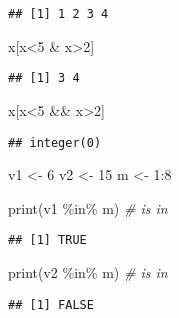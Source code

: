 \documentclass[
]{article}
\newenvironment{Shaded}{\begin{snugshade}}{\end{snugshade}}
\newcommand{\CommentTok}[1]{\textcolor[rgb]{0.56,0.35,0.01}{\textit{#1}}}
\newcommand{\DecValTok}[1]{\textcolor[rgb]{0.00,0.00,0.81}{#1}}
\newcommand{\FunctionTok}[1]{\textcolor[rgb]{0.00,0.00,0.00}{#1}}
\newcommand{\NormalTok}[1]{#1}
\newcommand{\OtherTok}[1]{\textcolor[rgb]{0.56,0.35,0.01}{#1}}
\newcommand{\SpecialCharTok}[1]{\textcolor[rgb]{0.00,0.00,0.00}{#1}}
\begin{document}
\begin{verbatim}
## [1] 1 2 3 4
\end{verbatim}

\begin{Shaded}
\begin{Highlighting}[]
\NormalTok{x[x}\SpecialCharTok{\textless{}}\DecValTok{5} \SpecialCharTok{\&}\NormalTok{ x}\SpecialCharTok{\textgreater{}}\DecValTok{2}\NormalTok{]}
\end{Highlighting}
\end{Shaded}

\begin{verbatim}
## [1] 3 4
\end{verbatim}

\begin{Shaded}
\begin{Highlighting}[]
\NormalTok{x[x}\SpecialCharTok{\textless{}}\DecValTok{5} \SpecialCharTok{\&\&}\NormalTok{ x}\SpecialCharTok{\textgreater{}}\DecValTok{2}\NormalTok{]}
\end{Highlighting}
\end{Shaded}

\begin{verbatim}
## integer(0)
\end{verbatim}

\begin{Shaded}
\begin{Highlighting}[]
\NormalTok{v1 }\OtherTok{\textless{}{-}} \DecValTok{6}
\NormalTok{v2 }\OtherTok{\textless{}{-}} \DecValTok{15}
\NormalTok{m }\OtherTok{\textless{}{-}} \DecValTok{1}\SpecialCharTok{:}\DecValTok{8}

\FunctionTok{print}\NormalTok{(v1 }\SpecialCharTok{\%in\%}\NormalTok{ m) }\CommentTok{\# is in}
\end{Highlighting}
\end{Shaded}

\begin{verbatim}
## [1] TRUE
\end{verbatim}

\begin{Shaded}
\begin{Highlighting}[]
\FunctionTok{print}\NormalTok{(v2 }\SpecialCharTok{\%in\%}\NormalTok{ m) }\CommentTok{\# is in}
\end{Highlighting}
\end{Shaded}

\begin{verbatim}
## [1] FALSE
\end{verbatim}
\end{document}
